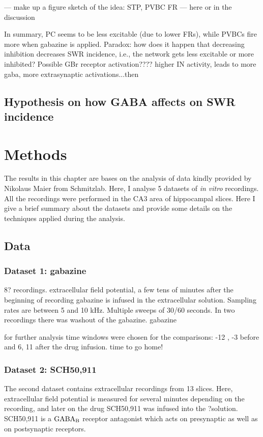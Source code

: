     --- make up a figure sketch of the idea: STP, PVBC FR --- here or in the discussion

    
    In summary, PC seems to be less excitable (due to lower FRs), while PVBCs
    fire more when gabazine is applied. Paradox: how does it happen that
    decreasing inhibition decreases SWR incidence, i.e., the network gets less
    excitable or more inhibited? Possible GBr receptor activation???? higher IN
    activity, leads to more gaba, more extrasynaptic activations...then 

  \subsection{Hypothesis on how GABA affects on SWR incidence} 


\section{Methods}
  The results in this chapter are bases on the analysis of data kindly provided
  by Nikolaus Maier from Schmitzlab. Here, I analyse 5 datasets of {\it in
  vitro} recordings. All the recordings were performed in the CA3 area of
  hippocampal slices. Here I give a brief summary about the datasets and
  provide some details on the techniques applied during the analysis.

  \subsection{Data}
    \subsubsection{Dataset 1: gabazine}
     
      8? recordings.
      extracellular field potential, a few tens of minutes after the beginning of recording gabazine is infused in the extracellular solution.
      Sampling rates are between 5 and 10 kHz.
      Multiple sweeps of 30/60 seconds.
      In two recordings there was washout of the gabazine.
      gabazine 


      for further analysis time windows were chosen for the comparisons:
        -12 , -3 before and 6, 11 after the drug infusion.
        time to go home!




    \subsubsection{Dataset 2: SCH50,911}
      The second dataset contains extracellular recordings from 13 slices.
      Here, extracellular field potential is measured for several minutes
      depending on the recording, and later on the drug SCH50,911 was infused
      into the ?solution.  SCH50,911 is a ${\rm GABA_B}$ receptor antagonist
      which acts on presynaptic as well as on postsynaptic receptors.


